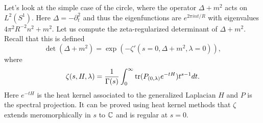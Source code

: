 \documentclass{amsart}
\begin{document}
Let's look at the simple case of the circle, where the operator $\Delta+m^2$ acts on
$L^2(S^1)$. Here $\Delta=-\partial_t^2$ and thus the eigenfunctions are $e^{2\pi int/R}$
with eigenvalues $4\pi^2R^{-2}n^2+m^2$. Let us compute the zeta-regularized determinant of
$\Delta+m^2$. Recall that this is defined
\begin{equation*}
    \det(\Delta+m^2) = \exp(-\zeta'(s=0,\Delta+m^2,\lambda=0)),
\end{equation*}
where
\begin{equation*}
    \zeta(s,H,\lambda) = \frac{1}{\Gamma(s)}\int_0^\infty \operatorname{tr}(P_{(0,\lambda)}e^{-tH}) t^{s-1} dt.
\end{equation*}
Here $e^{-tH}$ is the heat kernel associated to the generalized Laplacian $H$
and $P$ is the spectral projection. It can be proved using heat kernel methods
that $\zeta$ extends meromorphically in $s$ to $\mathbb{C}$ and is regular at $s=0$.
\end{document}
